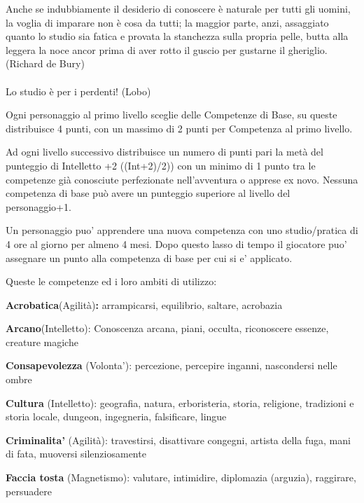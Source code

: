 \documentclass[a4paper,11pt,twoside,openany]{book}
\begin{document}
\label{competenze-di-base}

\begin{tcolorbox}[enhanced,arc=5pt,boxrule=0.3pt]{
		Anche se indubbiamente il desiderio di conoscere è naturale per tutti gli uomini, la voglia di imparare non è cosa da tutti; la maggior parte, anzi, assaggiato quanto lo studio sia fatica e provata la stanchezza sulla propria pelle, butta alla leggera la noce ancor prima di aver rotto il guscio per gustarne il gheriglio. (Richard de Bury)\\\\
		Lo studio è per i perdenti! (Lobo)
	}\end{tcolorbox}\medskip

Ogni personaggio al primo livello sceglie delle Competenze di Base, su queste distribuisce 4 punti, con un massimo di 2 punti per Competenza al primo livello.

Ad ogni livello successivo distribuisce un numero di punti pari la metà del punteggio di Intelletto +2 ((Int+2)/2)) con un minimo di 1 punto tra le competenze già conosciute perfezionate nell'avventura o apprese ex novo. Nessuna competenza di base può avere un  punteggio superiore al livello del personaggio+1.

Un personaggio puo' apprendere una nuova competenza con uno studio/pratica di 4 ore al giorno per almeno 4 mesi. Dopo questo lasso di tempo il giocatore puo' assegnare un punto alla competenza di base per cui si e' applicato.

\bigskip

Queste le competenze ed i loro ambiti di utilizzo:

\textbf{Acrobatica}(Agilità)\textbf{:} arrampicarsi, equilibrio, saltare, acrobazia

\textbf{Arcano}(Intelletto): Conoscenza arcana, piani, occulta, riconoscere essenze, creature magiche

\textbf{Consapevolezza} (Volonta'): percezione, percepire inganni, nascondersi nelle ombre

\textbf{Cultura} (Intelletto): geografia, natura, erboristeria, storia, religione, tradizioni e storia locale, dungeon, ingegneria, falsificare, lingue

\textbf{Criminalita'} (Agilità): travestirsi, disattivare congegni, artista della fuga, mani di fata, muoversi silenziosamente

\textbf{Faccia tosta} (Magnetismo): valutare, intimidire, diplomazia (arguzia), raggirare, persuadere
\end{document}
